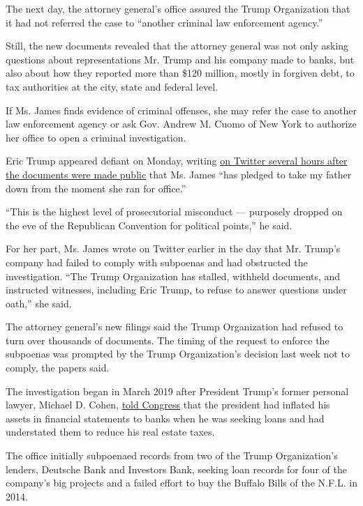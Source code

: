 The next day, the attorney general's office assured the Trump
Organization that it had not referred the case to ``another criminal law
enforcement agency.''

Still, the new documents revealed that the attorney general was not only
asking questions about representations Mr. Trump and his company made to
banks, but also about how they reported more than \$120 million, mostly
in forgiven debt, to tax authorities at the city, state and federal
level.

If Ms. James finds evidence of criminal offenses, she may refer the case
to another law enforcement agency or ask Gov. Andrew M. Cuomo of New
York to authorize her office to open a criminal investigation.

Eric Trump appeared defiant on Monday, writing
\href{https://twitter.com/EricTrump/status/1297981193841979394}{on
Twitter several hours after the documents were made public} that Ms.
James ``has pledged to take my father down from the moment she ran for
office.''

``This is the highest level of prosecutorial misconduct --- purposely
dropped on the eve of the Republican Convention for political points,''
he said.

For her part, Ms. James wrote on Twitter earlier in the day that Mr.
Trump's company had failed to comply with subpoenas and had obstructed
the investigation. ``The Trump Organization has stalled, withheld
documents, and instructed witnesses, including Eric Trump, to refuse to
answer questions under oath,'' she said.

The attorney general's new filings said the Trump Organization had
refused to turn over thousands of documents. The timing of the request
to enforce the subpoenas was prompted by the Trump Organization's
decision last week not to comply, the papers said.

The investigation began in March 2019 after President Trump's former
personal lawyer, Michael D. Cohen,
\href{https://www.nytimes3xbfgragh.onion/2019/02/27/business/donald-trump-buffalo-bills-deutsche-bank.html}{told
Congress} that the president had inflated his assets in financial
statements to banks when he was seeking loans and had understated them
to reduce his real estate taxes.

The office initially subpoenaed records from two of the Trump
Organization's lenders, Deutsche Bank and Investors Bank, seeking loan
records for four of the company's big projects and a failed effort to
buy the Buffalo Bills of the N.F.L. in 2014.

